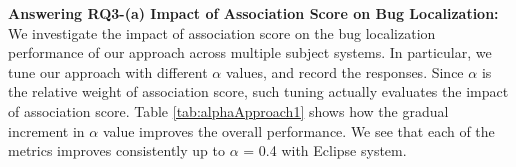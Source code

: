 \documentclass[conference]{IEEEtran}
\begin{document}
\textbf{Answering RQ3-(a) Impact of Association Score on Bug Localization:} We investigate the impact of association score on the bug localization performance of our approach across multiple subject systems. 
In particular, we tune our approach with different $\alpha$ values, and record the responses. Since $\alpha$ is the relative weight of association score, such tuning actually evaluates the impact of association score.  
Table \ref{tab:alphaApproach1} shows how the gradual increment in $\alpha$ value improves the overall performance. We see that each of the metrics improves consistently up to $\alpha$ = 0.4 with Eclipse system. 
 \begin{table}[!tb]
	\centering
	\caption{Impact of Weighting Parameter on BLuAMIR with Eclipse}
	\vspace{-.2cm}
	\label{tab:alphaApproach1}
	\centering
\end{table}
\end{document}
